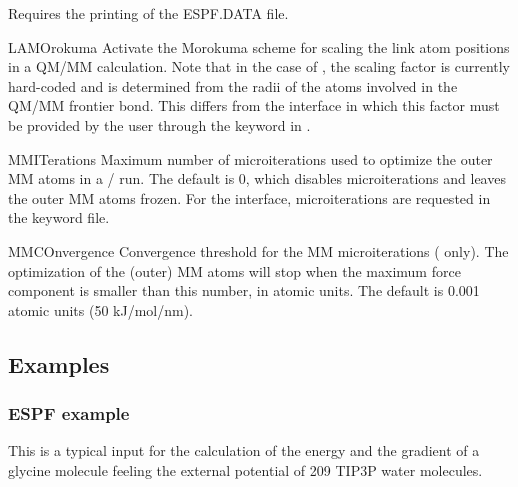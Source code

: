 \begin{keywordlist}
Requires the printing of the ESPF.DATA file.
\item[LAMOrokuma]
Activate the Morokuma scheme for scaling the link atom positions in a QM/MM calculation. Note that in the case of , the scaling factor is currently hard-coded and is determined from the radii of the atoms involved in the QM/MM frontier bond. This differs from the  interface in which this factor must be provided by the user through the  keyword in .
\item[MMITerations]
Maximum number of microiterations used to optimize the outer MM atoms in a \molcas/ run. The default is 0, which disables microiterations and leaves the outer MM atoms frozen. For the  interface, microiterations are requested in the  keyword file.
\item[MMCOnvergence]
Convergence threshold for the MM microiterations ( only). The optimization of the (outer) MM atoms will stop when the maximum force component is smaller than this number, in atomic units. The default is 0.001 atomic units (50 kJ/mol/nm).
\end{keywordlist}


\subsection{Examples}

\subsubsection{ESPF example}
This is a typical input for the calculation of the energy and the gradient of a glycine molecule feeling the external potential of 209 TIP3P water molecules.

